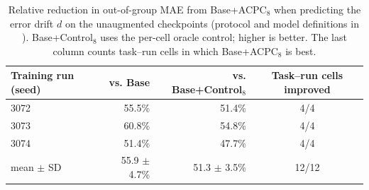 \begin{table}[!htb]
\centering
\caption{Relative reduction in out-of-group MAE from Base+ACPC$_8$ when predicting the error drift $d$ on the unaugmented checkpoints (protocol and model definitions in ). Base+Control$_8$ uses the per-cell oracle control; higher is better. The last column counts task--run cells in which Base+ACPC$_8$ is best.}
\label{tab:target-aligned-acpc}
\small
\setlength{\tabcolsep}{6pt}
\begin{tabular}{lrrc}
\toprule
Training run (seed) & vs. Base & vs. Base+Control$_8$ & Task--run cells improved \\
\midrule
3072 & 55.5\% & 51.4\% & 4/4 \\
3073 & 60.8\% & 54.8\% & 4/4 \\
3074 & 51.4\% & 47.7\% & 4/4 \\
\midrule
mean $\pm$ SD & 55.9 $\pm$ 4.7\% & 51.3 $\pm$ 3.5\% & 12/12 \\
\bottomrule
\end{tabular}
\end{table}
